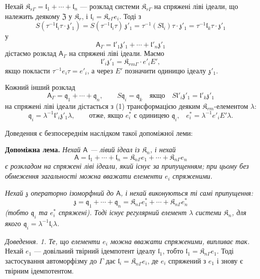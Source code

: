\documentclass[11pt]{article}
\begin{document}
Нехай \(\mathfrak K_{r\Gamma}=\mathfrak l_1+\cdots+\mathfrak l_n\) --- розклад системи \(\mathfrak K_{r\Gamma}\) на спряжені ліві ідеали, що належить деякому \(\mathfrak Z\) у \(\mathfrak K_r\), і \(\mathfrak l_i=\mathfrak K_{r\Gamma}e_i\). Тоді з
\[
S(\tau^{-1}\mathfrak l_i\tau\cdot\mathfrak z'_1)
=S(\tau^{-1}\mathfrak l_i\tau)\,\mathfrak z'_1
=\tau^{-1}(S\mathfrak l_i)\tau\cdot\mathfrak z'_1
=\tau^{-1}\mathfrak l_k\tau\cdot\mathfrak z'_1
\]
у
\[
\tag{1}
\mathsf{A}_\Gamma=\mathfrak l'_1\mathfrak z'_1+\cdots+\mathfrak l'_n\mathfrak z'_1
\]
дістаємо розклад \(\mathsf{A}_\Gamma\) на спряжені ліві ідеали. Маємо
\[
\mathfrak l'_i\mathfrak z'_1=\mathfrak K_{rm\Gamma}\cdot e'_iE',
\]
якщо покласти \(\tau^{-1}e_i\tau=e'_i\), а через \(E'\) позначити одиницю ідеалу \(\mathfrak z'_1\).

Кожний інший розклад
\[
\tag{2}
\mathsf{A}_\Gamma=\mathfrak q_1+\cdots+\mathfrak q_n,\qquad
S\mathfrak q_i=\mathfrak q_k\quad\text{якщо}\quad
S\mathfrak l'_i\mathfrak z'_1=\mathfrak l'_k\mathfrak z'_1
\]
на спряжені ліві ідеали дістається з (1) трансформацією деяким \(\mathfrak K_{rm}\)-елементом \(\lambda\):
\[
\mathfrak q_i=\lambda^{-1}\mathfrak l'_i\mathfrak z'_1\lambda,
\qquad
\text{отже, якщо \(e_i^*\) є одиницею \(\mathfrak q_i\),}\quad
e_i^*=\lambda^{-1}e'_iE'\lambda.
\]

Доведення є безпосереднім наслідком такої допоміжної леми:

\textbf{Допоміжна лема.} \emph{Нехай \(\mathsf{A}\) --- лівий ідеал із \(\mathfrak K_n\), і нехай}
\[
\mathsf{A}=\mathfrak l_1+\cdots+\mathfrak l_n
=\mathfrak K_{n\Gamma}e_1+\cdots+\mathfrak K_{n\Gamma}e_n
\]
\emph{є розкладом на спряжені ліві ідеали, який існує за припущенням; при цьому без обмеження загальності можна вважати елементи \(e_i\) спряженими.}

\emph{Нехай \(\mathfrak z\) операторно ізоморфний до \(\mathsf{A}\), і нехай виконуються ті самі припущення:}
\[
\mathfrak z=\mathfrak q_1+\cdots+\mathfrak q_n
=\mathfrak K_{n\Gamma}e_1^*+\cdots+\mathfrak K_{n\Gamma}e_n^*
\]
\emph{(тобто \(\mathfrak q_i\) та \(e_i^*\) спряжені). Тоді існує регулярний елемент \(\lambda\) системи \(\mathfrak K_n\), для якого \(\mathfrak q_i=\lambda^{-1}\mathfrak l_i\lambda\).}

\emph{Доведення. 1. Те, що елементи \(e_i\) можна вважати спряженими, випливає так.} Нехай \(e_1\) --- довільний твірний ідемпотент ідеалу \(\mathfrak l_1\), тобто \(\mathfrak l_1=\mathfrak K_{n\Gamma}e_1\). Тоді застосування автоморфізму до \(\Gamma\) дає \(\mathfrak l_i=\mathfrak K_{n\Gamma}e_i\), де \(e_i\) спряжений з \(e_1\) і знову є твірним ідемпотентом.
\end{document}
